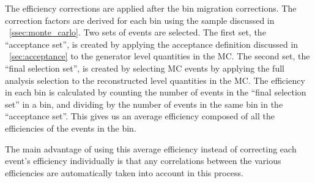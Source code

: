 The efficiency corrections are applied after the bin migration corrections. The
correction factors are derived for each \phistar bin using the \Ztoee \MADGRAPH
sample discussed in \SEC~\ref{ssec:monte_carlo}. Two sets of events are
selected. The first set, the ``acceptance set'', is created by applying the
acceptance definition discussed in \SEC~\ref{sec:acceptance} to the generator
level quantities in the MC. The second set, the ``final selection set'', is
created by selecting MC events by applying the full analysis selection to the
reconstructed level quantities in the MC. The efficiency in each \phistar bin
is calculated by counting the number of events in the ``final selection set''
in a bin, and dividing by the number of events in the same bin in the
``acceptance set''. This gives us an average efficiency composed of all the
efficiencies of the events in the bin.

The main advantage of using this average efficiency instead of correcting each
event's efficiency individually is that any correlations between the various
efficiencies are automatically taken into account in this process.

